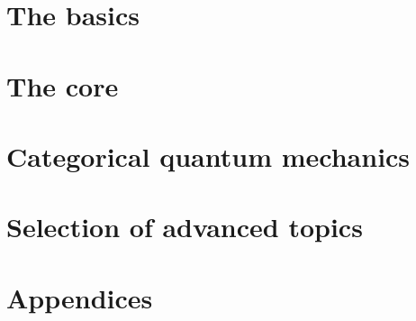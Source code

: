 \documentclass[10pt,a4paper,footinclude=true,headinclude=true]{scrbook}
\theoremstyle{classicdef}
\theoremstyle{remark}
\begin{document}
\pagestyle{plain}



\pagestyle{scrheadings}


\cleardoublepage
\cleardoublepage
\cleardoublepage
\mainmatter
\cleardoublepage
{}
\part{The basics}





\cleardoublepage
\part{The core}




\cleardoublepage
\part{Categorical quantum mechanics}

\part{Selection of advanced topics}




\cleardoublepage
\part{Appendices}
\appendix



\end{document}
